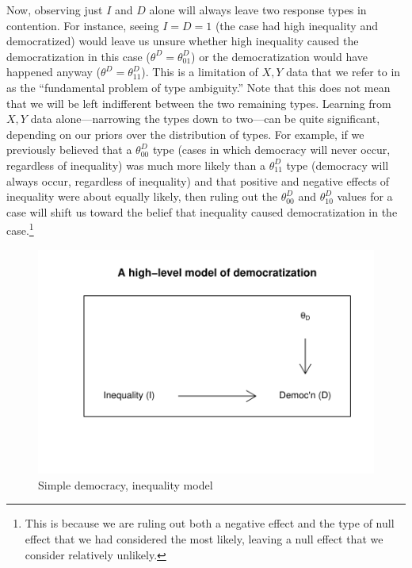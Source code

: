 \documentclass[
  12pt,
]{book}
\begin{document}
Now, observing just \(I\) and \(D\) alone will always leave two response types in contention. For instance, seeing \(I=D=1\) (the case had high inequality and democratized) would leave us unsure whether high inequality caused the democratization in this case (\(\theta^D=\theta_{01}^D\)) or the democratization would have happened anyway (\(\theta^D=\theta_{11}^D\)). This is a limitation of \(X, Y\) data that we refer to in \citet{humphreys2015mixing} as the ``fundamental problem of type ambiguity.'' Note that this does not mean that we will be left indifferent between the two remaining types. Learning from \(X, Y\) data alone---narrowing the types down to two---can be quite significant, depending on our priors over the distribution of types. For example, if we previously believed that a \(\theta_{00}^D\) type (cases in which democracy will never occur, regardless of inequality) was much more likely than a \(\theta_{11}^D\) type (democracy will always occur, regardless of inequality) and that positive and negative effects of inequality were about equally likely, then ruling out the \(\theta_{00}^D\) and \(\theta_{10}^D\) values for a case will shift us toward the belief that inequality caused democratization in the case.\footnote{This is because we are ruling out both a negative effect and the type of null effect that we had considered the most likely, leaving a null effect that we consider relatively unlikely.}

\begin{figure}

{\centering \includegraphics{ii_files/figure-latex/dagdemochigh-1} 

}

\caption{Simple democracy, inequality model}\label{fig:dagdemochigh}
\end{figure}
\end{document}
